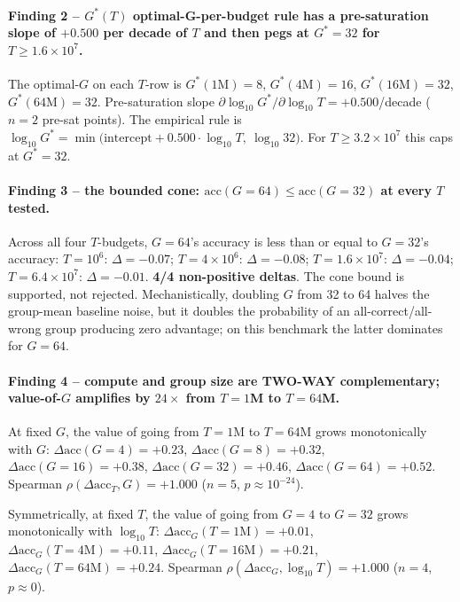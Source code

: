 \paragraph{Finding 2 -- $G^{\ast}(T)$ optimal-G-per-budget rule has a
pre-saturation slope of $+0.500$ per decade of $T$ and then pegs at
$G^{\ast}{=}32$ for $T{\ge}1.6{\times}10^{7}$.}
The optimal-$G$ on each $T$-row is $G^{\ast}(1\mathrm{M})=8$,
$G^{\ast}(4\mathrm{M})=16$, $G^{\ast}(16\mathrm{M})=32$,
$G^{\ast}(64\mathrm{M})=32$. Pre-saturation slope
$\partial \log_{10}G^{\ast}/\partial \log_{10}T = +0.500$/decade
($n{=}2$ pre-sat points). The empirical rule is
$\log_{10}G^{\ast} = \min\bigl(\mathrm{intercept} + 0.500\cdot\log_{10}T,\ \log_{10}32\bigr)$.
For $T{\ge}3.2{\times}10^{7}$ this caps at $G^{\ast}{=}32$.

\paragraph{Finding 3 -- the bounded cone: $\mathrm{acc}(G{=}64) \le \mathrm{acc}(G{=}32)$ at every $T$ tested.}
Across all four $T$-budgets, $G{=}64$'s accuracy is less than or equal
to $G{=}32$'s accuracy:
$T{=}10^{6}$: $\Delta = -0.07$;
$T{=}4{\times}10^{6}$: $\Delta = -0.08$;
$T{=}1.6{\times}10^{7}$: $\Delta = -0.04$;
$T{=}6.4{\times}10^{7}$: $\Delta = -0.01$.
\textbf{4/4 non-positive deltas}. The cone bound is supported, not
rejected. Mechanistically, doubling $G$ from 32 to 64 halves the
group-mean baseline noise, but it doubles the probability of an
all-correct/all-wrong group producing zero advantage; on this
benchmark the latter dominates for $G{=}64$.

\paragraph{Finding 4 -- compute and group size are TWO-WAY
complementary; value-of-$G$ amplifies by $24\times$ from $T{=}1$M to
$T{=}64$M.}
At fixed $G$, the value of going from $T{=}1$M to $T{=}64$M grows
monotonically with $G$:
$\Delta\mathrm{acc}(G{=}4) = +0.23$,
$\Delta\mathrm{acc}(G{=}8) = +0.32$,
$\Delta\mathrm{acc}(G{=}16) = +0.38$,
$\Delta\mathrm{acc}(G{=}32) = +0.46$,
$\Delta\mathrm{acc}(G{=}64) = +0.52$.
Spearman $\rho(\Delta\mathrm{acc}_{T}, G) = +1.000$ ($n{=}5$, $p{\approx}10^{-24}$).

Symmetrically, at fixed $T$, the value of going from $G{=}4$ to $G{=}32$
grows monotonically with $\log_{10}T$:
$\Delta\mathrm{acc}_{G}(T{=}1\mathrm{M}) = +0.01$,
$\Delta\mathrm{acc}_{G}(T{=}4\mathrm{M}) = +0.11$,
$\Delta\mathrm{acc}_{G}(T{=}16\mathrm{M}) = +0.21$,
$\Delta\mathrm{acc}_{G}(T{=}64\mathrm{M}) = +0.24$.
Spearman $\rho(\Delta\mathrm{acc}_{G}, \log_{10}T) = +1.000$
($n{=}4$, $p{\approx}0$).

